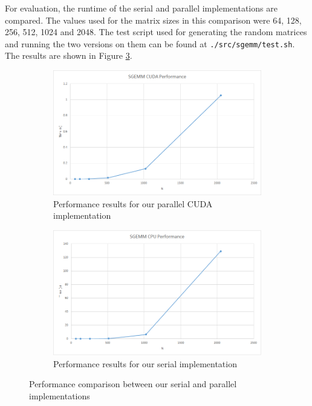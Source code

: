 \documentclass[11pt,a4paper]{article}
\begin{document}
	For evaluation, the runtime of the serial and parallel implementations are compared. The values used for the matrix sizes in this comparison were 64, 128, 256, 512, 1024 and 2048. The test script used for generating the random matrices and running the two versions on them can be found at \texttt{./src/sgemm/test.sh}. The results are shown in Figure \ref{perf}.
	\begin{figure}
		\centering
		\begin{subfigure}[t]{0.45\textwidth}
			\includegraphics[width=\textwidth]{sgemm_cuda.png}
			\caption{Performance results for our parallel CUDA implementation}
			\label{nbody_cuda}
		\end{subfigure}
		\begin{subfigure}[t]{0.45\textwidth}
			\includegraphics[width=\textwidth]{sgemm_cpu.png}
			\caption{Performance results for our serial implementation}
			\label{nbody_cpu}
		\end{subfigure}
		\caption{Performance comparison between our serial and parallel implementations}
		\label{perf}
	\end{figure}
	\pagebreak
	
\end{document}
